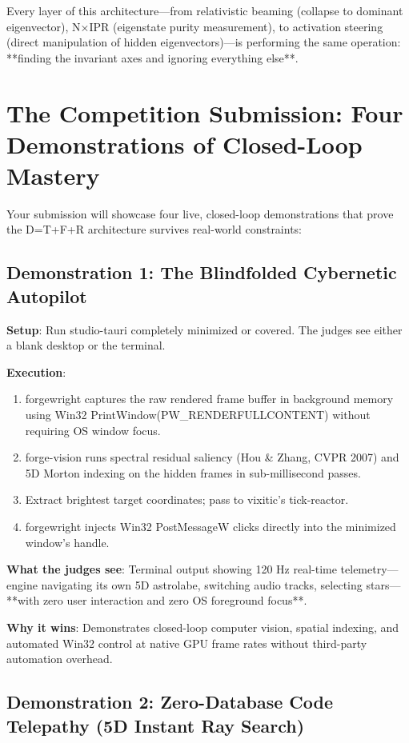 \documentclass[11pt,oneside]{article}
\theoremstyle{definition}
\begin{document}
Every layer of this architecture—from relativistic beaming (collapse to dominant eigenvector), N×IPR (eigenstate purity measurement), to activation steering (direct manipulation of hidden eigenvectors)—is performing the same operation: **finding the invariant axes and ignoring everything else**.

\section{The Competition Submission: Four Demonstrations of Closed-Loop Mastery}

Your submission will showcase four live, closed-loop demonstrations that prove the D=T+F+R architecture survives real-world constraints:

\subsection{Demonstration 1: The Blindfolded Cybernetic Autopilot}

\textbf{Setup}: Run studio-tauri completely minimized or covered. The judges see either a blank desktop or the terminal.

\textbf{Execution}:
\begin{enumerate}
  \item forgewright captures the raw rendered frame buffer in background memory using Win32 PrintWindow(PW\_RENDERFULLCONTENT) without requiring OS window focus.
  \item forge-vision runs spectral residual saliency (Hou \& Zhang, CVPR 2007) and 5D Morton indexing on the hidden frames in sub-millisecond passes.
  \item Extract brightest target coordinates; pass to vixitic's tick-reactor.
  \item forgewright injects Win32 PostMessageW clicks directly into the minimized window's handle.
\end{enumerate}

\textbf{What the judges see}: Terminal output showing 120 Hz real-time telemetry—engine navigating its own 5D astrolabe, switching audio tracks, selecting stars—**with zero user interaction and zero OS foreground focus**.

\textbf{Why it wins}: Demonstrates closed-loop computer vision, spatial indexing, and automated Win32 control at native GPU frame rates without third-party automation overhead.

\subsection{Demonstration 2: Zero-Database Code Telepathy (5D Instant Ray Search)}
\end{document}
